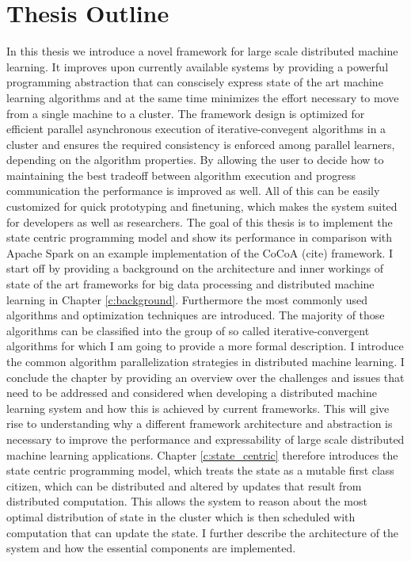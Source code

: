\section{Thesis Outline}
In this thesis we introduce a novel framework for large scale distributed machine learning.
It improves upon currently available systems by providing a powerful programming abstraction that can conscisely express state of the art machine learning algorithms and at the same time minimizes the effort necessary to move from a single machine to a cluster.
The framework design is optimized for efficient parallel asynchronous execution of iterative-convegent algorithms in a cluster and ensures the required consistency is enforced among parallel learners, depending on the algorithm properties. By allowing the user to decide how to maintaining the best tradeoff between algorithm execution and progress communication the performance is improved as well.
All of this can be easily customized for quick prototyping and finetuning, which makes the system suited for developers as well as researchers.
The goal of this thesis is to implement the state centric programming model and show its performance in comparison with Apache Spark on an example implementation of the CoCoA (cite) framework.
I start off by providing a background on the architecture and inner workings of state of the art frameworks for big data processing and distributed machine learning in Chapter \ref{c:background}. Furthermore the most commonly used algorithms and optimization techniques are introduced.
The majority of those algorithms can be classified into the group of so called iterative-convergent algorithms for which I am going to provide a more formal description. I introduce the common algorithm parallelization strategies in distributed machine learning.
I conclude the chapter by providing an overview over the challenges and issues that need to be addressed and considered when developing a distributed machine learning system and how this is achieved by current frameworks.
This will give rise to understanding why a different framework architecture and abstraction is necessary to improve the performance and expressability of large scale distributed machine learning applications.
Chapter \ref{c:state_centric} therefore introduces the state centric programming model, which treats the state as a mutable first class citizen, which can be distributed and altered by updates that result from distributed computation.
This allows the system to reason about the most optimal distribution of state in the cluster which is then scheduled with computation that can update the state. I further describe the architecture of the system and how the essential components are implemented.
